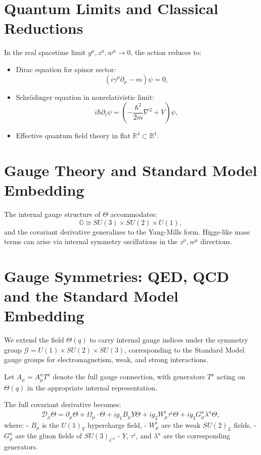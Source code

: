 \documentclass[12pt]{article}
\begin{document}
\section{Quantum Limits and Classical Reductions}

In the real spacetime limit \( y^\mu, z^\mu, w^\mu \to 0 \), the action reduces to:
\begin{itemize}
  \item Dirac equation for spinor sector:
  \[
  (i \gamma^\mu \partial_\mu - m) \psi = 0,
  \]
  \item Schrödinger equation in nonrelativistic limit:
  \[
  i \hbar \partial_t \psi = \left( -\frac{\hbar^2}{2m} \nabla^2 + V \right) \psi,
  \]
  \item Effective quantum field theory in flat \( \mathbb{R}^4 \subset \mathbb{B}^4 \).
\end{itemize}


\section{Gauge Theory and Standard Model Embedding}

The internal gauge structure of \( \Theta \) accommodates:
\[
\mathbb{G} \cong SU(3) \times SU(2) \times U(1),
\]
and the covariant derivative generalizes to the Yang-Mills form. Higgs-like mass terms can arise via internal symmetry oscillations in the \( z^\mu, w^\mu \) directions.

\section{Gauge Symmetries: QED, QCD and the Standard Model Embedding}

We extend the field \(\Theta(q)\) to carry internal gauge indices under the symmetry group \( \mathcal{G} = U(1) \times SU(2) \times SU(3) \), corresponding to the Standard Model gauge groups for electromagnetism, weak, and strong interactions.

Let \(A_\mu = A_\mu^a T^a\) denote the full gauge connection, with generators \(T^a\) acting on \(\Theta(q)\) in the appropriate internal representation.

The full covariant derivative becomes:
\[
\mathcal{D}_\mu \Theta = \partial_\mu \Theta + \Omega_\mu \cdot \Theta + i g_1 B_\mu Y \Theta + i g_2 W_\mu^i \tau^i \Theta + i g_3 G_\mu^a \lambda^a \Theta,
\]
where:
- \(B_\mu\) is the \(U(1)_Y\) hypercharge field,
- \(W_\mu^i\) are the weak \(SU(2)_L\) fields,
- \(G_\mu^a\) are the gluon fields of \(SU(3)_C\),
- \(Y\), \(\tau^i\), and \(\lambda^a\) are the corresponding generators.
\end{document}
